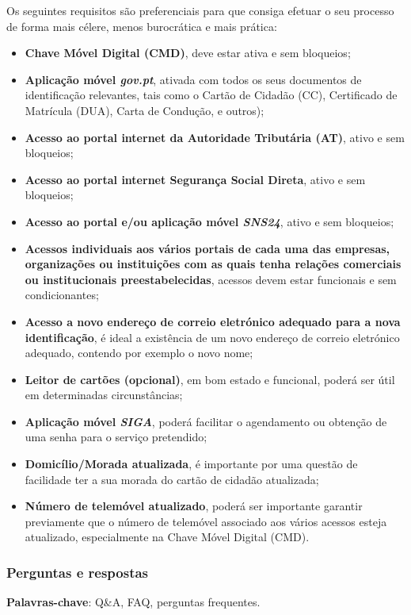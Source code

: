 Os seguintes requisitos são preferenciais para que consiga efetuar o seu
processo de forma mais célere, menos burocrática e mais prática:
\begin{itemize}
	\item \textbf{Chave Móvel Digital (CMD)}, deve estar ativa e sem bloqueios;
	\item \textbf{Aplicação móvel \emph{gov.pt}}, ativada com todos os seus documentos de identificação relevantes, tais como o Cartão de Cidadão (CC), Certificado de Matrícula (DUA), Carta de Condução, e outros);
	\item \textbf{Acesso ao portal internet da Autoridade Tributária (AT)}, ativo e sem bloqueios;
	\item \textbf{Acesso ao portal internet Segurança Social Direta}, ativo e sem bloqueios;
	\item \textbf{Acesso ao portal e/ou aplicação móvel \emph{SNS24}}, ativo e sem bloqueios;
	\item \textbf{Acessos individuais aos vários portais de cada uma das empresas, organizações ou instituições com as quais tenha relações comerciais ou institucionais preestabelecidas}, acessos devem estar funcionais e sem condicionantes;
	\item \textbf{Acesso a novo endereço de correio eletrónico adequado para a nova identificação}, é ideal a existência de um novo endereço de correio eletrónico adequado, contendo por exemplo o novo nome;
	\item \textbf{Leitor de cartões (opcional)}, em bom estado e funcional, poderá ser útil em determinadas circunstâncias;
	\item \textbf{Aplicação móvel \emph{SIGA}}, poderá facilitar o agendamento ou obtenção de uma senha para o serviço pretendido;
	\item \textbf{Domicílio/Morada atualizada}, é importante por uma questão de facilidade ter a sua morada do cartão de cidadão atualizada;
	\item \textbf{Número de telemóvel atualizado}, poderá ser importante garantir previamente que o número de telemóvel associado aos vários acessos esteja atualizado, especialmente na Chave Móvel Digital (CMD).
\end{itemize}

\subsubsection{Perguntas e respostas}

\textbf{Palavras-chave}: Q\&A, FAQ, perguntas frequentes. \\

